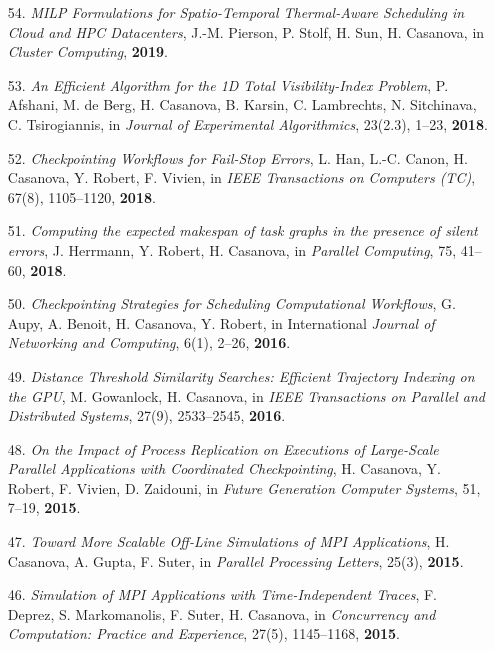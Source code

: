 \begin{enumerate}
\item [54.] {\it MILP Formulations for Spatio-Temporal Thermal-Aware Scheduling in Cloud and HPC Datacenters}, J.-M. Pierson, P. Stolf, H. Sun, H. Casanova,   in \emph{Cluster Computing}, {\bf 2019}.

\item [53.] {\it An Efficient Algorithm for the 1D Total Visibility-Index
Problem}, P. Afshani, M. de Berg, H. Casanova, B. Karsin, C. Lambrechts, N.
        Sitchinava, C. Tsirogiannis, in \emph{Journal of Experimental Algorithmics},
23(2.3), 1--23, {\bf 2018}.

\item [52.] {\it Checkpointing Workflows for Fail-Stop Errors},
L. Han, L.-C. Canon, H. Casanova, Y. Robert, F. Vivien,
        in \emph{IEEE Transactions on Computers (TC)}, 67(8), 1105--1120, {\bf 2018}.

    \item [51.] {\it Computing the expected makespan of task graphs in the presence of silent errors}, J. Herrmann, Y. Robert, H. Casanova,  in \emph{Parallel Computing}, 75, 41--60, {\bf 2018}.

\item [50.] {\it Checkpointing Strategies for Scheduling Computational Workflows}, G. Aupy, A. Benoit, H. Casanova, Y.  Robert, in International
    \emph{Journal of Networking and Computing}, 6(1), 2--26, {\bf 2016}.

\item [49.] {\it Distance Threshold Similarity Searches: Efficient
Trajectory Indexing on the GPU}, M. Gowanlock, H. Casanova, in \emph{IEEE
Transactions on Parallel and Distributed Systems}, 27(9), 2533--2545, {\bf 2016}.

\item [48.] {\it On the Impact of Process Replication on Executions of Large-Scale Parallel Applications with Coordinated Checkpointing},
H. Casanova, Y. Robert, F. Vivien, D. Zaidouni, in \emph{ Future Generation
Computer Systems}, 51, 7--19, {\bf 2015}.

\item [47.] {\it Toward More Scalable Off-Line Simulations of MPI Applications}, H. Casanova, A. Gupta, F. Suter, in \emph{Parallel Processing Letters}, 25(3), {\bf 2015}.

\item [46.] {\it Simulation of MPI Applications with Time-Independent Traces},
F. Deprez, S. Markomanolis, F. Suter, H. Casanova,
in \emph{Concurrency and Computation: Practice and Experience},
27(5), 1145--1168, {\bf 2015}.


\end{enumerate}
